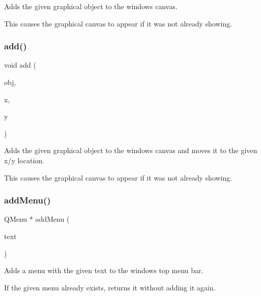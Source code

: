 Adds the given graphical object to the window\textquotesingle{}s canvas. 

This causes the graphical canvas to appear if it was not already showing. \mbox{\label{classGWindow_ac302bb932e3905e5d368ce735ad8444c}} 
\subsubsection{\texorpdfstring{add()}{add()}\hspace{0.1cm}{\footnotesize\ttfamily [8/8]}}
{\footnotesize\ttfamily void add (\begin{DoxyParamCaption}\item[{\mbox{\hyperlink{classGObject}{G\+Object}} \&}]{obj,  }\item[{double}]{x,  }\item[{double}]{y }\end{DoxyParamCaption})\hspace{0.3cm}{\ttfamily [virtual]}}



Adds the given graphical object to the window\textquotesingle{}s canvas and moves it to the given x/y location. 

This causes the graphical canvas to appear if it was not already showing. \mbox{\label{classGWindow_afffea482963d5566e97ccccb1f94a4e2}} 
\subsubsection{\texorpdfstring{add\+Menu()}{addMenu()}}
{\footnotesize\ttfamily Q\+Menu $\ast$ add\+Menu (\begin{DoxyParamCaption}\item[{const std\+::string \&}]{text }\end{DoxyParamCaption})\hspace{0.3cm}{\ttfamily [virtual]}}



Adds a menu with the given text to the window\textquotesingle{}s top menu bar. 

If the given menu already exists, returns it without adding it again. \mbox{\label{classGWindow_a43efd24277d68e749443cb7c36b65f4b}} 
